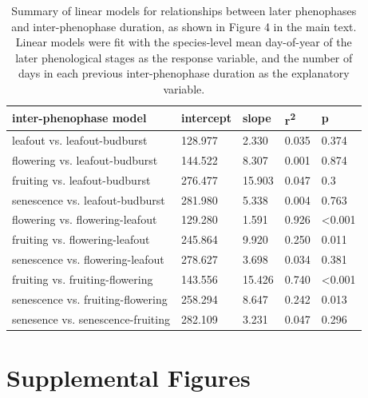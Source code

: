 \documentclass{article}
\begin{document}
\begin{table}[ht]
\centering
\caption{Summary of linear models for relationships between later phenophases and inter-phenophase duration, as shown in Figure 4 in the main text. Linear models were fit with the species-level mean day-of-year of the later phenological stages as the response variable, and the number of days in each previous inter-phenophase duration as the explanatory variable.} 
\label{table:interphase}
\begin{tabular}{|p{}|p{}|p{}|p{}|p{}|}
  \hline
inter-phenophase model & intercept & slope & r\textsuperscript{2} & p \\ 
  \hline
leafout vs. leafout-budburst & 128.977 & 2.330 & 0.035 & 0.374 \\ 
  flowering vs. leafout-budburst & 144.522 & 8.307 & 0.001 & 0.874 \\ 
  fruiting vs. leafout-budburst & 276.477 & 15.903 & 0.047 & 0.3 \\ 
  senescence vs. leafout-budburst & 281.980 & 5.338 & 0.004 & 0.763 \\ 
  flowering vs. flowering-leafout & 129.280 & 1.591 & 0.926 & <0.001 \\ 
  fruiting vs. flowering-leafout & 245.864 & 9.920 & 0.250 & 0.011 \\ 
  senescence vs. flowering-leafout & 278.627 & 3.698 & 0.034 & 0.381 \\ 
  fruiting vs. fruiting-flowering & 143.556 & 15.426 & 0.740 & <0.001 \\ 
  senescence vs. fruiting-flowering & 258.294 & 8.647 & 0.242 & 0.013 \\ 
  senesence vs. senescence-fruiting & 282.109 & 3.231 & 0.047 & 0.296 \\ 
   \hline
\end{tabular}
\end{table}\clearpage

\section* {Supplemental Figures}
\end{document}
